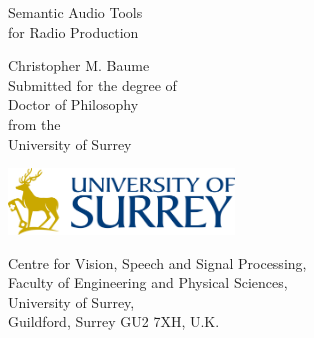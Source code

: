 \documentclass[11pt,a4paper]{report}
\begin{document}
\begin{titlepage}
  \vspace*{\fill}
  \begin{center}
    {\Huge Semantic Audio Tools\\for Radio Production\par\vspace{1.5cm}}
    {\Large Christopher M. Baume}\\[1cm]
    {\large Submitted for the degree of\\Doctor of Philosophy\\from the\\
      University of Surrey}\\[1cm]
    \begin{center}
      \includegraphics[width=6cm]{figs/surrey-logo.png}\\[1cm]
    \end{center}
    {\small Centre for Vision, Speech and Signal Processing,\\
      Faculty of Engineering and Physical Sciences,\\
      University of Surrey,\\
      Guildford, Surrey GU2 7XH, U.K.}
  \end{center}
  \vspace*{\fill}
\end{titlepage}





{\singlespacing
\tableofcontents
}

\listoffigures

\listoftables

















\begin{appendices}
  \renewcommand\chaptername{Appendix}
  
\end{appendices}

\printbibliography
\end{document}
